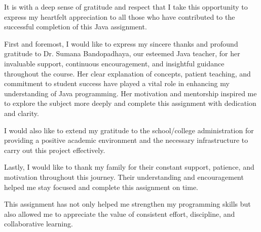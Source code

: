 {
It is with a deep sense of gratitude and respect that I take this opportunity to express my heartfelt appreciation to all those who have contributed to the successful completion of this Java assignment.

First and foremost, I would like to express my sincere thanks and profound gratitude to Dr. Sumana Bandopadhaya, our esteemed Java teacher, for her invaluable support, continuous encouragement, and insightful guidance throughout the course. Her clear explanation of concepts, patient teaching, and commitment to student success have played a vital role in enhancing my understanding of Java programming. Her motivation and mentorship inspired me to explore the subject more deeply and complete this assignment with dedication and clarity.

I would also like to extend my gratitude to the school/college administration for providing a positive academic environment and the necessary infrastructure to carry out this project effectively.

Lastly, I would like to thank my family for their constant support, patience, and motivation throughout this journey. Their understanding and encouragement helped me stay focused and complete this assignment on time.

This assignment has not only helped me strengthen my programming skills but also allowed me to appreciate the value of consistent effort, discipline, and collaborative learning.
}
